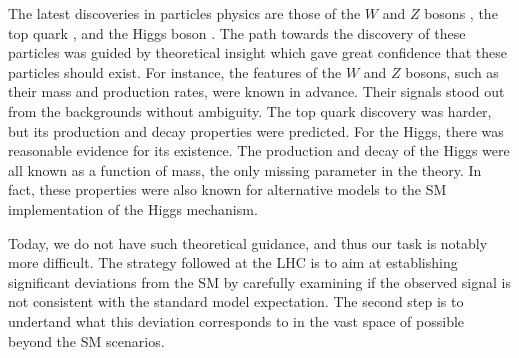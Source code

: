 The latest discoveries in particles physics are those of the 
$W$ and $Z$ bosons \cite{Arnison:1984qu,Bagnaia:1983zx}, the top quark  
\cite{PhysRevLett.74.2626,Abachi:1995iq}, and the Higgs boson \cite{atlas_higgs, cms_higgs}.
The path towards the discovery of these particles was guided by 
theoretical insight which gave great confidence that these particles 
should exist. 
For instance, the features of the $W$ and $Z$ bosons, such as their mass 
and production rates, were known in advance. 
Their signals stood out from the backgrounds without ambiguity.
The top quark discovery was harder, but its production and decay 
properties were predicted.
For the Higgs, there was reasonable evidence for its existence.
The production and decay of the Higgs were all known as a function of 
mass, the only missing parameter in the theory. 
In fact, these properties were also known for alternative models 
to the SM implementation of the Higgs mechanism.

Today, we do not have such theoretical guidance, and thus our task 
is notably more difficult.
The strategy followed at the LHC is to aim at establishing 
significant deviations from the SM by carefully examining 
if the observed signal is not consistent with the standard model expectation.
The second step is to undertand what this deviation corresponds to 
in the vast space of possible beyond the SM scenarios.

